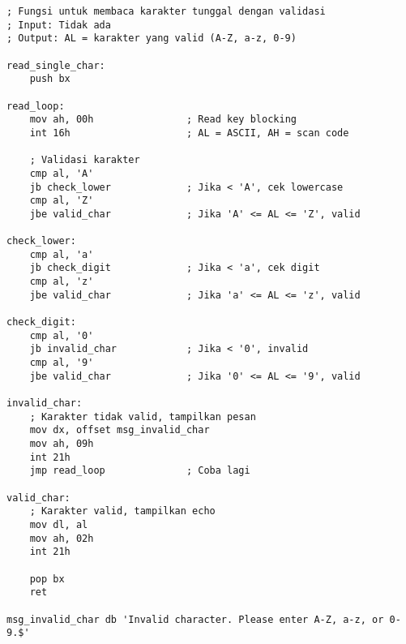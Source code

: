\documentclass[../main.tex]{subfiles}
\begin{document}
\begin{lstlisting}[language={[x86masm]Assembler}, caption=Input Karakter Tunggal, label={lst:single-char}]
; Fungsi untuk membaca karakter tunggal dengan validasi
; Input: Tidak ada
; Output: AL = karakter yang valid (A-Z, a-z, 0-9)

read_single_char:
    push bx
    
read_loop:
    mov ah, 00h                ; Read key blocking
    int 16h                    ; AL = ASCII, AH = scan code
    
    ; Validasi karakter
    cmp al, 'A'
    jb check_lower             ; Jika < 'A', cek lowercase
    cmp al, 'Z'
    jbe valid_char             ; Jika 'A' <= AL <= 'Z', valid
    
check_lower:
    cmp al, 'a'
    jb check_digit             ; Jika < 'a', cek digit
    cmp al, 'z'
    jbe valid_char             ; Jika 'a' <= AL <= 'z', valid
    
check_digit:
    cmp al, '0'
    jb invalid_char            ; Jika < '0', invalid
    cmp al, '9'
    jbe valid_char             ; Jika '0' <= AL <= '9', valid
    
invalid_char:
    ; Karakter tidak valid, tampilkan pesan
    mov dx, offset msg_invalid_char
    mov ah, 09h
    int 21h
    jmp read_loop              ; Coba lagi
    
valid_char:
    ; Karakter valid, tampilkan echo
    mov dl, al
    mov ah, 02h
    int 21h
    
    pop bx
    ret
    
msg_invalid_char db 'Invalid character. Please enter A-Z, a-z, or 0-9.$'
\end{lstlisting}
\end{document}
